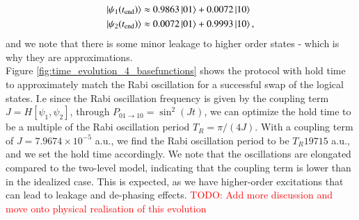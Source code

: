 \documentclass{subfiles}
\begin{document}
\begin{align*}
    \ket{\psi_1(t_{\text{end}})} &\approx 0.9863 \ket{01} + 0.0072 \ket{10}  \\
    \ket{\psi_2(t_{\text{end}})} &\approx 0.0072 \ket{01} + 0.9993 \ket{10},
\end{align*}
and we note that there is some minor leakage to higher order states - which is why they are approximations. 
\\
Figure \ref{fig:time_evolution_4_basefunctions} shows the protocol with hold time to approximately match the Rabi oscillation for a successful swap of the logical states. I.e since the Rabi oscillation frequency is given by the coupling term $J = H[\psi_1, \psi_2]$, through $P_{01\to10} = \sin^2(J t)$, we can optimize the hold time to be a multiple of the Rabi oscillation period $T_R = \pi/(4J)$. With a coupling term of $J = 7.9674 \times 10^{-5}$ a.u., we find the Rabi oscillation period to be $T_R 19715 $ a.u., and we set the hold time accordingly. We note that the oscillations are elongated compared to the two-level model, indicating that the coupling term is lower than in the idealized case. This is expected, as we have higher-order excitations that can lead to leakage and de-phasing effects. \textcolor{red}{TODO: Add more discussion and move onto physical realisation of this evolution}
\end{document}
